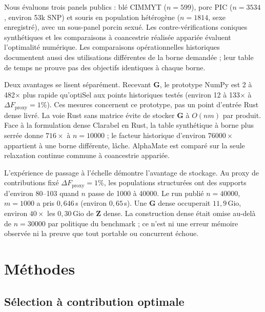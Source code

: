 \documentclass[11pt]{article}
\newcommand{\bG}{\mathbf{G}}
\newcommand{\bZ}{\mathbf{Z}}
\begin{document}
Nous évaluons trois panels publics : blé CIMMYT ($n=599$), porc PIC ($n=3534$, environ 53k SNP) et souris en population hétérogène ($n=1814$, sexe enregistré), avec un sous-panel porcin sexué. Les contre-vérifications coniques synthétiques et les comparaisons à coancestrie réalisée appariée évaluent l'optimalité numérique. Les comparaisons opérationnelles historiques documentent aussi des utilisations différentes de la borne demandée ; leur table de temps ne prouve pas des objectifs identiques à chaque borne.

Deux avantages se lisent séparément. Recevant $\bG$, le prototype NumPy est 2 à 482$\times$ plus rapide qu'optiSel aux points historiques testés (environ 12 à 133$\times$ à $\Delta F_{\mathrm{proxy}}=1\%$). Ces mesures concernent ce prototype, pas un point d'entrée Rust dense livré. La voie Rust sans matrice évite de stocker $\bG$ à $O(nm)$ par produit. Face à la formulation dense Clarabel en Rust, la table synthétique à borne plus serrée donne $716\times$ à $n=10000$ ; le facteur historique d'environ $76000\times$ appartient à une borne différente, lâche. AlphaMate est comparé sur la seule relaxation continue commune à coancestrie appariée.

L'expérience de passage à l'échelle démontre l'avantage de stockage. Au proxy de contributions fixé $\Delta F_{\mathrm{proxy}}=1\%$, les populations structurées ont des supports d'environ 80--103 quand $n$ passe de 1000 à 40000. Le run publié $n=40000$, $m=1000$ a pris $0{,}646$\,s (environ $0{,}65$\,s). Une $\bG$ dense occuperait $11{,}9$\,Gio, environ $40\times$ les $0{,}30$\,Gio de $\bZ$ dense. La construction dense était omise au-delà de $n=30000$ par politique du benchmark ; ce n'est ni une erreur mémoire observée ni la preuve que tout portable ou concurrent échoue.

\section{Méthodes}

\subsection{Sélection à contribution optimale}
\end{document}
